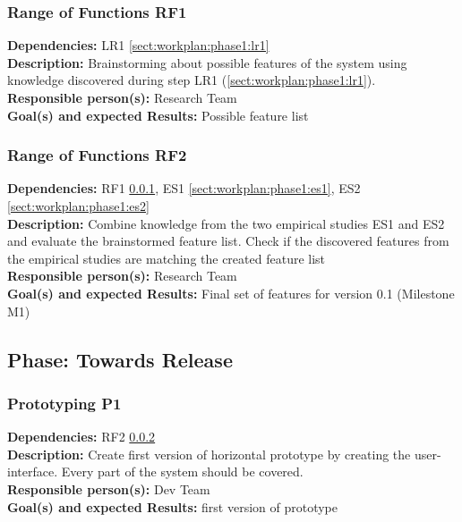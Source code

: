 \documentclass[a4paper,11pt]{article}
\begin{document}
\subsubsection{Range of Functions RF1}
\label{sect:workplan:phase1:rf1}
\textbf{Dependencies:} LR1 \ref{sect:workplan:phase1:lr1}\\
\textbf{Description:} Brainstorming about possible features of the system using knowledge discovered during step LR1 (\ref{sect:workplan:phase1:lr1}).\\
\textbf{Responsible person(s):} Research Team\\
\textbf{Goal(s) and expected Results:} Possible feature list\\

\pagebreak
\subsubsection{Range of Functions RF2}
\label{sect:workplan:phase1:rf2}
\textbf{Dependencies:} RF1 \ref{sect:workplan:phase1:rf1}, ES1 \ref{sect:workplan:phase1:es1}, ES2 \ref{sect:workplan:phase1:es2}\\
\textbf{Description:} Combine knowledge from the two empirical studies ES1 and ES2 and evaluate the brainstormed feature list. Check if the discovered features from the empirical studies are matching the created feature list\\
\textbf{Responsible person(s):} Research Team\\
\textbf{Goal(s) and expected Results:} Final set of features for version 0.1 (Milestone M1)\\

\subsection{Phase: Towards Release}
\label{sect:workplan:towardsrelease}

\subsubsection{Prototyping P1}
\label{sect:workplan:phase2:p1}
\textbf{Dependencies:} RF2 \ref{sect:workplan:phase1:rf2}\\
\textbf{Description:} Create first version of horizontal prototype by creating the user-interface. Every part of the system should be covered.\\
\textbf{Responsible person(s):} Dev Team\\
\textbf{Goal(s) and expected Results:} first version of prototype\\
\end{document}
